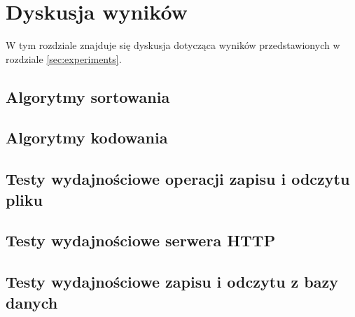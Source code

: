 \section{Dyskusja wyników}
W tym rozdziale znajduje się dyskusja dotycząca wyników przedstawionych w rozdziale \ref{sec:experiments}.

\subsection{Algorytmy sortowania}

\subsection{Algorytmy kodowania}

\subsection{Testy wydajnościowe operacji zapisu i odczytu pliku}

\subsection{Testy wydajnościowe serwera HTTP}

\subsection{Testy wydajnościowe zapisu i odczytu z bazy danych}
